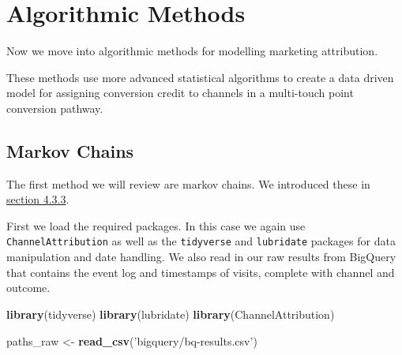 \documentclass[]{book}
\newenvironment{Shaded}{\begin{snugshade}}{\end{snugshade}}
\newcommand{\KeywordTok}[1]{\textcolor[rgb]{0.13,0.29,0.53}{\textbf{#1}}}
\newcommand{\StringTok}[1]{\textcolor[rgb]{0.31,0.60,0.02}{#1}}
\newcommand{\NormalTok}[1]{#1}
\begin{document}
\chapter{Algorithmic Methods}\label{algorithmic-methods}

Now we move into algorithmic methods for modelling marketing
attribution.

These methods use more advanced statistical algorithms to create a data
driven model for assigning conversion credit to channels in a
multi-touch point conversion pathway.

\hypertarget{markov-chains}{\section{Markov
Chains}\label{markov-chains}}

The first method we will review are markov chains. We introduced these
in \protect\hyperlink{markov-methods}{section 4.3.3}.

First we load the required packages. In this case we again use
\texttt{ChannelAttribution} as well as the \texttt{tidyverse} and
\texttt{lubridate} packages for data manipulation and date handling. We
also read in our raw results from BigQuery that contains the event log
and timestamps of visits, complete with channel and outcome.

\begin{Shaded}
\begin{Highlighting}[]
\KeywordTok{library}\NormalTok{(tidyverse)}
\KeywordTok{library}\NormalTok{(lubridate)}
\KeywordTok{library}\NormalTok{(ChannelAttribution)}

\NormalTok{paths_raw <-}\StringTok{ }\KeywordTok{read_csv}\NormalTok{(}\StringTok{'bigquery/bq-results.csv'}\NormalTok{)}
\end{Highlighting}
\end{Shaded}
\end{document}
